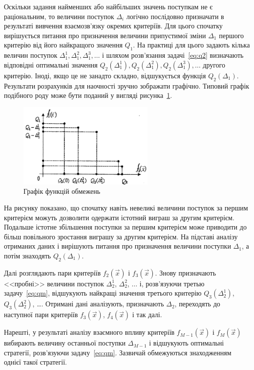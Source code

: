 Оскільки задання найменших або найбільших значень поступкам не є раціональним, то величини поступок $\Delta_i$ логічно послідовно призначати в результаті вивчення взаємозв'язку окремих критеріїв. 
Для цього спочатку вирішується питання про призначення величини припустимої зміни $\Delta_1$ першого критерію від його найкращого значення $Q_1$. 
На практиці для цього задають кілька величин поступок $\Delta_1^1, \Delta_1^2, \Delta_1^3, \dotsc$ і шляхом розв'язання задачі~\eqref{eq:q2} визначають відповідні оптимальні значення $Q_2(\Delta_1^1), Q_2(\Delta_1^2), Q_2(\Delta_1^3), \dotsc$ другого критерію. 
Іноді, якщо це не занадто складно, відшукується функція $Q_2(\Delta_1)$. 
Результати розрахунків для наочності зручно зображати графічно. 
Типовий графік подібного роду може бути поданий у вигляді рисунка~\ref{fig:example_q2}.

\begin{figure}[H]
  \centering
    \includegraphics[width=0.6\textwidth]{figures/example_q2}
  \caption{Графік функцій обмежень}
  \label{fig:example_q2}
\end{figure}

На рисунку показано, що спочатку навіть невеликі величини поступок за першим критерієм можуть дозволити одержати істотний виграш за другим критерієм.
Подальше істотне збільшення поступки за першим критерієм може приводити до більш повільного зростання виграшу за другим критерієм.
На підставі аналізу отриманих даних і вирішують питання про призначення величини поступки $\Delta_1$, а потім знаходять $Q_2(\Delta_1)$.

Далі розглядають пари критеріїв $f_2(\vec{x})$ і $f_3(\vec{x})$. 
Знову призначають <<пробні>> величини поступок $\Delta_2^1$, $\Delta_2^2$, $\dots$ і, розв'язуючи третью задачу~\eqref{eq:qm}, відшукують найкращі значення третього критерію $Q_3(\Delta_2^1)$, $Q_3(\Delta_2^2)$, \dots. 
Отримані дані аналізують, призначають $\Delta_2$, переходять до наступної пари критеріїв $f_3(\vec{x})$, $f_4(\vec{x})$ і так далі.

Нарешті, у результаті аналізу взаємного впливу критеріїв $f_{M-1}(\vec{x})$ і $f_{M}(\vec{x})$ вибирають величину останньої поступки $\Delta_{M-1}$ і відшукують оптимальні стратегії, розв'язуючи задачу~\eqref{eq:qm}. 
Зазвичай обмежуються знаходженням однієї такої стратегії.

